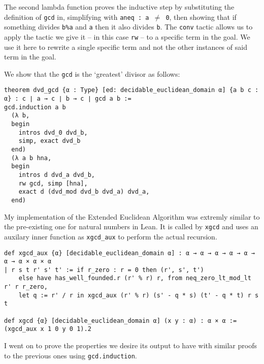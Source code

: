 \documentclass{article}
\newcommand{\ct}{\texttt}
\begin{document}
The second lambda function proves the inductive step by substituting the definition of \ct{gcd} in, simplifying with \ct{aneq : a $\neq$ 0}, then showing that if something divides \ct{b\%a} and \ct{a} then it also divides \ct{b}. The \ct{conv} tactic allows us to apply the tactic we give it -- in this case \ct{rw} -- to a specific term in the goal. We use it here to rewrite a single specific term and not the other instances of said term in the goal.

We show that the \ct{gcd} is the `greatest' divisor as follows:
\begin{lstlisting}
theorem dvd_gcd {α : Type} [ed: decidable_euclidean_domain α] {a b c : α} : c ∣ a → c ∣ b → c ∣ gcd a b :=
gcd.induction a b
  (λ b,
  begin
    intros dvd_0 dvd_b,
    simp, exact dvd_b
  end)
  (λ a b hna,
  begin
    intros d dvd_a dvd_b,
    rw gcd, simp [hna],
    exact d (dvd_mod dvd_b dvd_a) dvd_a,
  end)
\end{lstlisting}

My implementation of the Extended Euclidean Algorithm was extremly similar to the pre-existing one for natural numbers in Lean. It is called by \ct{xgcd} and uses an auxilary inner function as \ct{xgcd\_aux} to perform the actual recursion.
\begin{lstlisting}
def xgcd_aux {α} [decidable_euclidean_domain α] : α → α → α → α → α → α → α × α × α
| r s t r' s' t' := if r_zero : r = 0 then (r', s', t') 
    else have has_well_founded.r (r' % r) r, from neq_zero_lt_mod_lt r' r r_zero,
    let q := r' / r in xgcd_aux (r' % r) (s' - q * s) (t' - q * t) r s t

def xgcd {α} [decidable_euclidean_domain α] (x y : α) : α × α := (xgcd_aux x 1 0 y 0 1).2
\end{lstlisting}

I went on to prove the properties we desire its output to have with similar proofs to the previous ones using \ct{gcd.induction}.

\end{document}
